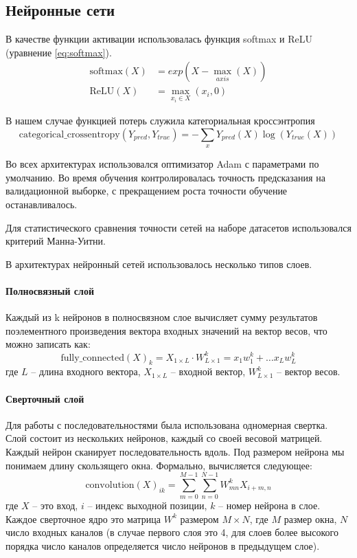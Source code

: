 \subsection{Нейронные сети}

В качестве функции активации использовалась функция softmax и ReLU (уравнение \ref{eq:softmax}).
\begin{align} \label{eq:softmax}
\text{softmax}(X) &= exp(X - \max_{axis}(X)) \\
\text{ReLU}(X) &= \max_{x_i \in X}(x_i, 0)
\end{align}


В нашем случае функцией потерь служила категориальная кроссэнтропия
\begin{equation} \label{eq:cross}
\text{categorical\_crossentropy}(Y_{pred}, Y_{true}) = -\sum_{x}{Y_{pred}(X)\log(Y_{true}(X))}
\end{equation}

Во всех архитектурах использовался оптимизатор  Adam \cite{kingma_adam:_2014} с параметрами по умолчанию. 
Во время обучения контролировалась точность предсказания на валидационной выборке, с прекращением роста точности обучение останавливалось.

Для статистического сравнения точности сетей на наборе датасетов использовался критерий Манна-Уитни.

В архитектурах нейронный сетей использовалось несколько типов слоев.
\paragraph{Полносвязный слой}
Каждый из k нейронов в полносвязном слое вычисляет сумму результатов поэлементного произведения вектора входных значений на вектор весов, что можно записать как:
\begin{equation}
	\text{fully_connected}(X)_{k} = X_{1\times L} \cdot W^k_{L\times 1} = x_1 w^k_1 +  \dots x_L w^k_L 
\end{equation}
где $L$ -- длина входного вектора, $X_{1\times L}$ -- входной вектор, $W^k_{L\times 1}$ -- вектор весов.

\paragraph{Сверточный слой}

Для работы с последовательностями была использована одномерная свертка. Слой состоит из нескольких нейронов, каждый со своей весовой матрицей. Каждый нейрон сканирует последовательность вдоль. Под размером нейрона мы понимаем длину скользящего окна. Формально, вычисляется следующее:
\begin{equation}
	\text{convolution}(X)_{ik} = \sum_{m=0}^{M-1}\sum_{n=0}^{N-1} W_{mn}^k X_{i+m, n}
\end{equation}
где $X$ -- это вход, $i$ -- индекс выходной позиции, $k$ -- номер нейрона в слое. Каждое сверточное ядро это матрица $W^k$ размером $M \times N$, где $M$ размер окна, $N$ число входных каналов (в случае первого слоя это 4, для слоев более высокого порядка число каналов определяется число нейронов в предыдущем слое).

